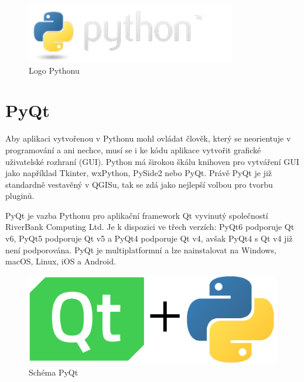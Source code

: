 \begin{figure}[H] \centering
    \includegraphics[width=260pt]{./pictures/python-logo.png}
    \caption[Logo Pythonu]{Logo Pythonu \cite{python}}
	\label{fig:python-logo}                                
\end{figure} 

\section{PyQt}
Aby aplikaci vytvořenou v Pythonu mohl ovládat člověk, který se neorientuje v programování a ani nechce,
musí se i ke kódu aplikace vytvořit grafické uživatelské rozhraní (GUI). Python má širokou škálu knihoven
pro vytváření GUI jako například Tkinter, wxPython, PySide2 nebo PyQt. Právě PyQt je již standardně 
vestavěný v QGISu, tak se zdá jako nejlepší volbou pro tvorbu pluginů.  

PyQt je vazba Pythonu pro aplikační framework Qt vyvinutý společností RiverBank Computing Ltd.
Je k dispozici ve třech verzích: PyQt6 podporuje Qt v6, PyQt5 podporuje Qt v5 a PyQt4 podporuje Qt v4,
avšak PyQt4 s Qt v4 již není podporována. PyQt je multiplatformní a lze nainstalovat na Windows,
macOS, Linux, iOS a Android. \cite{pyqt}

\begin{figure}[H] \centering
    \includegraphics[width=400pt]{./pictures/pyqt.png}
    \caption[Schéma PyQt Pythonu]{Schéma PyQt}
	\label{fig:pyqt}                                
\end{figure} 